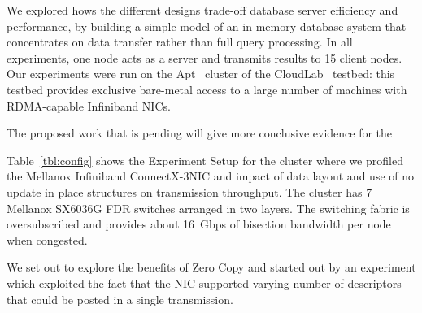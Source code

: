 

We explored hows the different designs trade-off database server efficiency and
performance, by building a simple model of an in-memory database system that
concentrates on data transfer rather than full query processing. In all experiments,
one node acts as a server and transmits results to 15 client nodes.
Our experiments were run on the Apt~\cite{Ricci+:OSR15} cluster of the
CloudLab~\cite{Cloudlab:URL} testbed: this testbed provides exclusive bare-metal
access to a large number of machines with RDMA-capable Infiniband NICs.

The proposed work that is pending will give more conclusive evidence for the 



Table~\ref{tbl:config} shows the Experiment Setup for the cluster where we profiled
the Mellanox Infiniband ConnectX-3\textregistered NIC and impact of data layout and 
use of no update in place structures on transmission throughput. The cluster has 7
Mellanox SX6036G FDR switches arranged in two layers. The switching fabric is
oversubscribed and provides about 16~Gbps of bisection bandwidth per node
when congested.

We set out to explore the benefits of Zero Copy and started out by an experiment 
which exploited the fact that the NIC supported varying number of descriptors 
that could be posted in a single transmission. 


